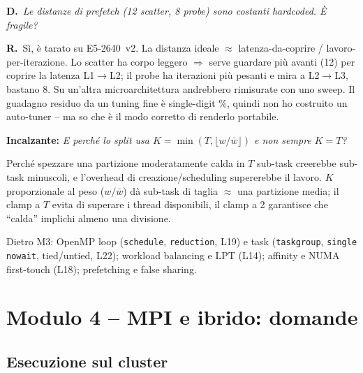 \documentclass[11pt,a4paper]{article}
\newcommand{\D}[1]{\begin{dom}\small\textbf{D.}\ \itshape #1\end{dom}}
\newcommand{\R}{\noindent\textbf{R.}\ }
\newcommand{\Inc}[1]{\par\smallskip\noindent\textbf{\textcolor{red!55!black}{Incalzante:}} \textit{#1}\ \par}
\begin{document}
\D{Le distanze di prefetch (12 scatter, 8 probe) sono costanti hardcoded. È fragile?}
\R Sì, è tarato su E5-2640~v2. La distanza ideale $\approx$ latenza-da-coprire / lavoro-per-iterazione. Lo scatter ha corpo leggero $\Rightarrow$ serve guardare più avanti (12) per coprire la latenza L1$\to$L2; il probe ha iterazioni più pesanti e mira a L2$\to$L3, bastano 8. Su un'altra microarchitettura andrebbero rimisurate con uno sweep. Il guadagno residuo da un tuning fine è single-digit \%, quindi non ho costruito un auto-tuner -- ma so che è il modo corretto di renderlo portabile.
\Inc{E perché lo split usa $K=\min(T,\lfloor w/\bar w\rfloor)$ e non sempre $K=T$?} Perché spezzare una partizione moderatamente calda in $T$ sub-task creerebbe sub-task minuscoli, e l'overhead di creazione/scheduling supererebbe il lavoro. $K$ proporzionale al peso ($w/\bar w$) dà sub-task di taglia $\approx$ una partizione media; il clamp a $T$ evita di superare i thread disponibili, il clamp a 2 garantisce che ``calda'' implichi almeno una divisione.

\begin{theorybox}
Dietro M3: OpenMP loop (\texttt{schedule}, \texttt{reduction}, L19) e task (\texttt{taskgroup}, \texttt{single nowait}, tied/untied, L22); workload balancing e LPT (L14); affinity e NUMA first-touch (L18); prefetching e false sharing.
\end{theorybox}
\section{Modulo 4 -- MPI e ibrido: domande}

\subsection{Esecuzione sul cluster}
\end{document}
